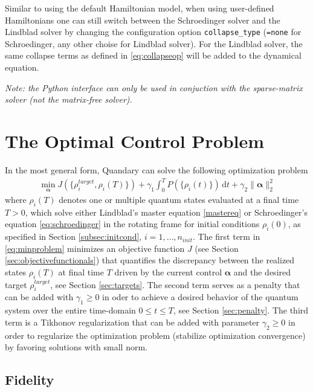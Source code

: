\documentclass[11pt]{article}
\newcommand{\bfa}{\boldsymbol{\alpha}}
\begin{document}
Similar to using the default Hamiltonian model, when using user-defined Hamiltonians one can still switch between the Schroedinger solver and the Lindblad solver by changing the configuration option \texttt{collapse\_type} (\texttt{=none} for Schroedinger, any other choise for Lindblad solver). For the Lindblad solver, the same collapse terms as defined in \eqref{eq:collapseop} will be added to the dynamical equation. 

\textit{Note: the Python interface can only be used in conjuction with the sparse-matrix solver (not the matrix-free solver).}

\section{The Optimal Control Problem} \label{sec:optim}
In the most general form, Quandary can solve the following optimization problem
\begin{align}\label{eq:minproblem}
  \min_{\boldsymbol{\alpha}} J(\{\rho^{target}_i, \rho_i(T) \}) + \gamma_1 \int_0^T P\left(\{\rho_i(t)\}\right) \, \mathrm{d} t + \gamma_2 \| \bfa \|^2_2
\end{align}
where $\rho_i(T)$ denotes one or multiple quantum states evaluated at a final time $T>0$, which solve either Lindblad's master equation \eqref{mastereq} or Schroedinger's equation \eqref{eq:schroedinger} in the rotating frame for initial conditions $\rho_i(0)$, as specified in Section \ref{subsec:initcond}, $i=1,\dots, n_{init}$. The first term in \eqref{eq:minproblem} minimizes an objective function $J$ (see Section \ref{sec:objectivefunctionals}) that quantifies the discrepancy between the realized states $\rho_i(T)$ at final time $T$ driven by the current control $\boldsymbol{\alpha}$ and the desired target $\rho^{target}_i$, see Section \ref{sec:targets}. 
The second term serves as a penalty that can be added with $\gamma_1 \geq 0$ in oder to achieve a desired behavior of the quantum system over the entire time-domain $0\leq t\leq T$, see Section \ref{sec:penalty}. 
The third term is a Tikhonov regularization that can be added with parameter $\gamma_2\geq 0$ in order to regularize the optimization problem (stabilize optimization convergence) by favoring solutions with small norm. 

\subsection{Fidelity}\label{sec:fidelity}
\end{document}
